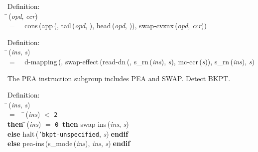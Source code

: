 \begin{tabbing}{\sc Definition}: \\  
\=\,({\it{opd\/}}, {\it{ccr\/}}) \\ 
$=$$\;\;\;\;${\rm{cons}}\,({\rm{app}}\,({}, {\rm{tail}}\,({\it{opd\/}}, {}), {\rm{head}}\,({\it{opd\/}}, {})), {\rm{swap-cvznx}}\,({\it{opd\/}}, {\it{ccr\/}}))\-
\end{tabbing}

\begin{tabbing}{\sc Definition}: \\  
\=\,({\it{ins\/}}, {\it{s\/}}) \\ 
$=$$\;\;\;\;${\rm{d-mapping}}\,({}, {\rm{swap-effect}}\,({\rm{read-dn}}\,({}, {\rm{s\_rn}}\,({\it{ins\/}}), {\it{s\/}}), {\rm{mc-ccr}}\,({\it{s\/}})), {\rm{s\_rn}}\,({\it{ins\/}}), {\it{s\/}})\-
\end{tabbing}

 The PEA instruction subgroup includes PEA and SWAP.
 Detect BKPT.
\begin{tabbing}{\sc Definition}: \\  
\=\,({\it{ins\/}}, {\it{s\/}}) \\ 
$=$$\;\;\;\;$\=\,({\it{ins\/}}) $<$ {\tt{2}} \\ 
{\bf then }\=\,({\it{ins\/}}) $=$ {\tt{0}}$\;\;${\bf then }{\rm{swap-ins}}\,({\it{ins\/}}, {\it{s\/}}) \\ 
{\bf else }{\rm{halt}}\,({\tt{'}}{\tt{bkpt-unspecified}}, {\it{s\/}})$\;${\bf  endif}\- \\ 
{\bf else }{\rm{pea-ins}}\,({\rm{s\_mode}}\,({\it{ins\/}}), {\it{ins\/}}, {\it{s\/}})$\;${\bf  endif}\-\-
\end{tabbing}

